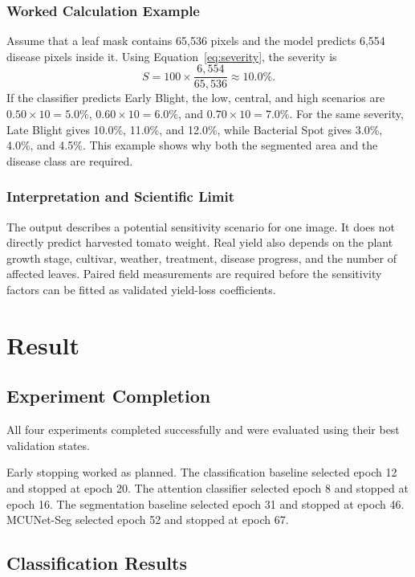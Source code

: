 \documentclass[12pt,a4paper]{article}
\begin{document}
\subsubsection{Worked Calculation Example}
Assume that a leaf mask contains 65,536 pixels and the model predicts 6,554 disease pixels
inside it. Using Equation~\ref{eq:severity}, the severity is
\begin{equation}
S=100\times\frac{6{,}554}{65{,}536}\approx 10.0\%.
\end{equation}
If the classifier predicts Early Blight, the low, central, and high scenarios are
$0.50\times10=5.0\%$, $0.60\times10=6.0\%$, and
$0.70\times10=7.0\%$. For the same severity, Late Blight gives 10.0\%, 11.0\%, and
12.0\%, while Bacterial Spot gives 3.0\%, 4.0\%, and 4.5\%. This example shows why both
the segmented area and the disease class are required.

\subsubsection{Interpretation and Scientific Limit}
The output describes a potential sensitivity scenario for one image. It does not directly
predict harvested tomato weight. Real yield also depends on the plant growth stage,
cultivar, weather, treatment, disease progress, and the number of affected leaves. Paired
field measurements are required before the sensitivity factors can be fitted as validated
yield-loss coefficients.

\section{Result}

\subsection{Experiment Completion}
All four experiments completed successfully and were evaluated using their best
validation states.

Early stopping worked as planned. The classification baseline selected epoch 12 and
stopped at epoch 20. The attention classifier selected epoch 8 and stopped at epoch 16.
The segmentation baseline selected epoch 31 and stopped at epoch 46. MCUNet-Seg
selected epoch 52 and stopped at epoch 67.

\subsection{Classification Results}
\end{document}
